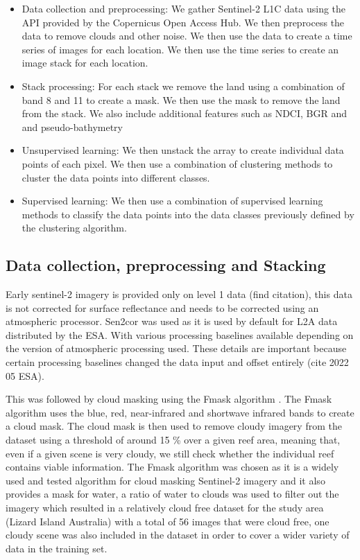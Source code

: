 \documentclass[journal,article,submit,pdftex,moreauthors]{Definitions/mdpi}
\begin{document}
\begin{itemize}
	\item Data collection and preprocessing: We gather Sentinel-2 L1C data using the API provided by the Copernicus Open Access Hub. We then preprocess the data to remove clouds and other noise. We then use the data to create a time series of images for each location. We then use the 
	time series to create an image stack for each location.
	\item Stack processing: For each stack we remove the land using a combination of band 8 and 11 to create a mask. We then use the mask to remove the land from the stack. We also include additional features such as NDCI, BGR and and pseudo-bathymetry
	\item Unsupervised learning: We then unstack the array to create individual data points of each pixel. We then use a combination of clustering methods to cluster the data points into different classes. 
	\item Supervised learning: We then use a combination of supervised learning methods to classify the data points into the data classes previously defined by the clustering algorithm.
\end{itemize}

\subsection*{Data collection, preprocessing and Stacking}
Early sentinel-2 imagery is provided only on level 1 data (find citation), this data is not corrected for surface reflectance and needs to be corrected using an atmospheric processor. Sen2cor was 
used as it is used by default for L2A data distributed by the ESA. With various processing baselines available depending on the version of atmospheric processing used. These details are important because 
certain processing baselines changed the data input and offset entirely (cite 2022 05 ESA).  


This was followed by cloud masking using the Fmask algorithm \cite{Zhe2012}. The Fmask algorithm uses the blue, red, near-infrared and shortwave infrared bands to create a cloud mask. 
The cloud mask is then used to remove cloudy imagery from the dataset using a threshold of around 15
\% over a given reef area, meaning that, even if a given scene is very cloudy, we still check whether the individual reef contains viable information. 
The Fmask algorithm was chosen as it is a widely used and tested algorithm for cloud masking Sentinel-2 imagery and it also provides a mask for water, a ratio of water to clouds was used to filter out the imagery which resulted 
in a relatively cloud free dataset for the study area (Lizard Island Australia) with a total of 56 images that were cloud free, one cloudy scene was also included in the dataset in order to cover a wider variety of data in the training set.
\end{document}
